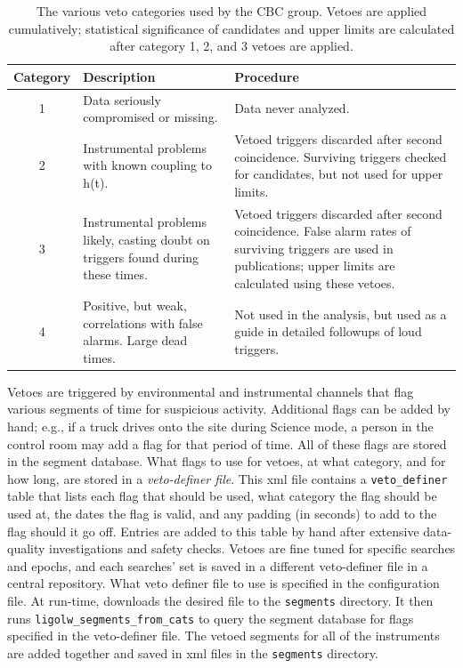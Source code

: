 \begin{table}
\center
\begin{tabular}{c | p{5cm} | p{8cm}}
Category    &    Description    &   Procedure    \\
\hline
    1       &    Data seriously compromised or missing.    &    Data never analyzed. \\
\hline
    2       &    Instrumental problems with known coupling to h(t).    &    Vetoed triggers discarded after second coincidence. Surviving triggers checked for candidates, but not used for upper limits. \\
\hline
    3       &    Instrumental problems likely, casting doubt on triggers found during these times.    &    Vetoed triggers discarded after second coincidence. False alarm rates of surviving triggers are used in publications; upper limits are calculated using these vetoes.  \\
\hline
    4       &    Positive, but weak, correlations with false alarms. Large dead times.    &     Not used in the analysis, but used as a guide in detailed followups of loud triggers. \\
\end{tabular}
\caption{The various veto categories used by the \ac{CBC} group. Vetoes are applied cumulatively; statistical significance of candidates and upper limits are calculated after category 1, 2, and 3 vetoes are applied.}
\label{tab:vetocats}
\end{table}

Vetoes are triggered by environmental and instrumental channels that flag
various segments of time for suspicious activity. Additional flags can be added
by hand; e.g., if a truck drives onto the site during Science mode, a person
in the control room may add a flag for that period of time. All of these flags
are stored in the segment database. What flags to use for vetoes, at what
category, and for how long, are stored in a \emph{veto-definer file}. This xml
file contains a \texttt{veto\_definer} table that lists each flag that should
be used, what category the flag should be used at, the dates the flag is valid, and any
padding (in seconds) to add to the flag should it go off. Entries are added to
this table by hand after extensive data-quality investigations and safety
checks. Vetoes are fine tuned for specific searches and epochs, and each
searches' set is saved in a different veto-definer file in a central
repository. What veto definer file to use is specified in the \ihope
configuration file. At run-time, \ihope downloads the desired file to the
\texttt{segments} directory. It then runs \texttt{ligolw\_segments\_from\_cats}
to query the segment database for flags specified in the veto-definer file. The
vetoed segments for all of the instruments are added together and saved in xml
files in the \texttt{segments} directory.


